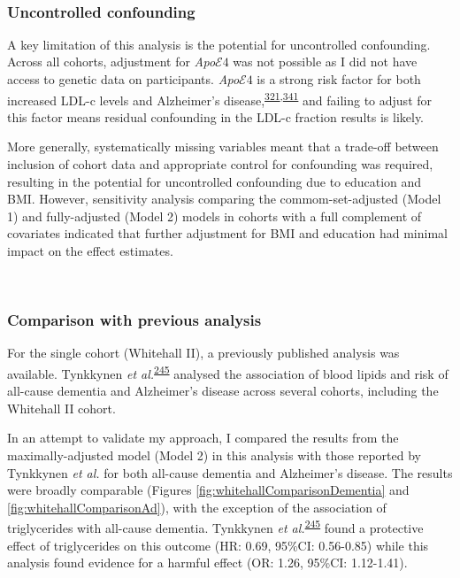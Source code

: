\documentclass[a4paper, twoside]{templates/ociamthesis}
\begin{document}
~

\hypertarget{uncontrolled-confounding}{%
\subsubsection{Uncontrolled confounding}\label{uncontrolled-confounding}}

A key limitation of this analysis is the potential for uncontrolled confounding. Across all cohorts, adjustment for \emph{Apo}\(\mathcal{E}4\) was not possible as I did not have access to genetic data on participants. \emph{Apo}\(\mathcal{E}4\) is a strong risk factor for both increased LDL-c levels and Alzheimer's disease,\textsuperscript{\protect\hyperlink{ref-bennet2007}{321},\protect\hyperlink{ref-safieh2019}{341}} and failing to adjust for this factor means residual confounding in the LDL-c fraction results is likely.

More generally, systematically missing variables meant that a trade-off between inclusion of cohort data and appropriate control for confounding was required, resulting in the potential for uncontrolled confounding due to education and BMI. However, sensitivity analysis comparing the commom-set-adjusted (Model 1) and fully-adjusted (Model 2) models in cohorts with a full complement of covariates indicated that further adjustment for BMI and education had minimal impact on the effect estimates.

~

\hypertarget{comparison-with-previous-analysis}{%
\subsubsection{Comparison with previous analysis}\label{comparison-with-previous-analysis}}

For the single cohort (Whitehall II), a previously published analysis was available. Tynkkynen \emph{et al.}\textsuperscript{\protect\hyperlink{ref-tynkkynen2018}{245}} analysed the association of blood lipids and risk of all-cause dementia and Alzheimer's disease across several cohorts, including the Whitehall II cohort.

In an attempt to validate my approach, I compared the results from the maximally-adjusted model (Model 2) in this analysis with those reported by Tynkkynen \emph{et al.} for both all-cause dementia and Alzheimer's disease. The results were broadly comparable (Figures \ref{fig:whitehallComparisonDementia} and \ref{fig:whitehallComparisonAd}), with the exception of the association of triglycerides with all-cause dementia. Tynkkynen \emph{et al.}\textsuperscript{\protect\hyperlink{ref-tynkkynen2018}{245}} found a protective effect of triglycerides on this outcome (HR: 0.69, 95\%CI: 0.56-0.85) while this analysis found evidence for a harmful effect (OR: 1.26, 95\%CI: 1.12-1.41).
\end{document}
